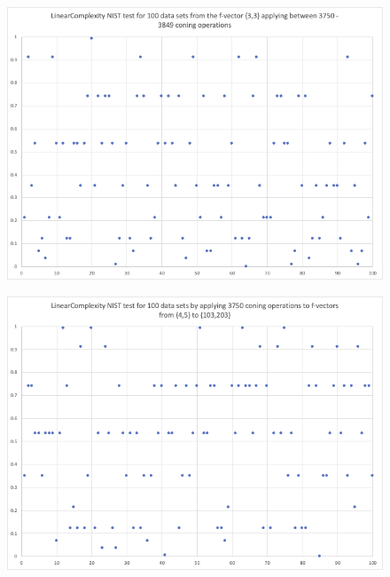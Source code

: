 \documentclass[oneside,12pt]{amsart}
\theoremstyle{definition}
\numberwithin{equation}{section}
\begin{document}
\begin{figure}[h!]
\centering
\includegraphics[scale=.5]{./charts/LinearComplexity_3_3.png}
\label{fig:linear33}
\end{figure}

\begin{figure}[h!]
\centering
\includegraphics[scale=.5]{./charts/LinearComplexity_4_5.png}
\label{fig:linear45}
\end{figure}
\end{document}
